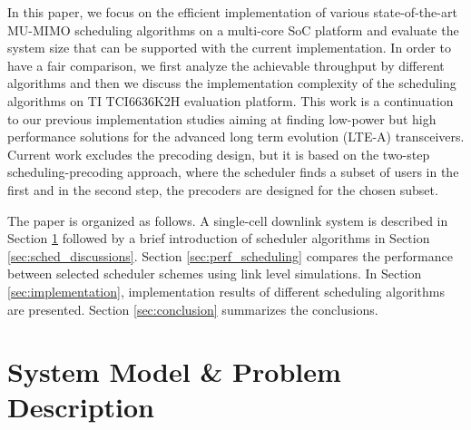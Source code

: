 \documentclass[conference,letterpaper,9pt]{./../IEEEtran}
\begin{document}
In this paper, we focus on the efficient implementation of various state-of-the-art \ac{MU-MIMO} scheduling algorithms on a multi-core \ac{SoC} platform and evaluate the system size that can be supported with the current implementation. In order to have a fair comparison, we first analyze the achievable throughput by different algorithms and then we discuss the implementation complexity of the scheduling algorithms on TI TCI6636K2H evaluation platform. This work is a continuation to our previous implementation studies \cite{Janhunen-etal-11, Hanninen-etal-2014, Shahabuddin-etal-2014} aiming at finding low-power but high performance solutions for the advanced long term evolution (LTE-A) transceivers. Current work excludes the precoding design, but it is based on the two-step scheduling-precoding approach, where the scheduler finds a subset of users in the first and in the second step, the precoders are designed for the chosen subset.

The paper is organized as follows. A single-cell downlink system is described in Section \ref{sec:system_model} followed by a brief introduction of scheduler algorithms in Section \ref{sec:sched_discussions}. Section \ref{sec:perf_scheduling} compares the performance between selected scheduler schemes using link level simulations. In Section \ref{sec:implementation}, implementation results of different scheduling algorithms are presented. Section \ref{sec:conclusion} summarizes the conclusions.

\section{System Model \& Problem Description}
\label{sec:system_model}
\end{document}
